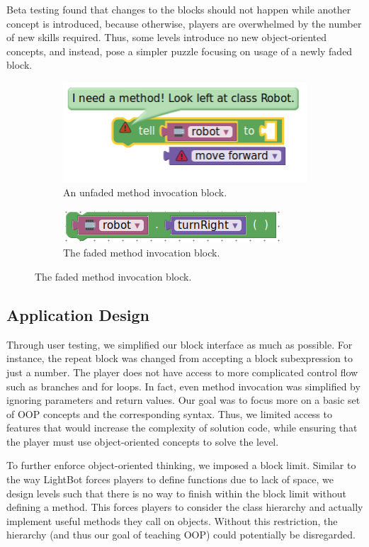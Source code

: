 \documentclass[12pt,notitlepage]{article}
\begin{document}
Beta testing found that changes to the blocks should not happen while
another concept is introduced, because otherwise, players are
overwhelmed by the number of new skills required. Thus, some levels
introduce no new object-oriented concepts, and instead, pose a simpler
puzzle focusing on usage of a newly faded block.

\begin{figure}[h]
\centering
\begin{subfigure}{.5\textwidth}
  \centering
  \includegraphics[width=.5\textwidth]{block_unfaded}
  \caption{An unfaded method invocation block.}\label{fig:block-unfaded}
\end{subfigure}%
\begin{subfigure}{.5\textwidth}
  \centering
  \includegraphics[width=.5\textwidth]{block_faded}
  \caption{The faded method invocation block.}\label{fig:block-faded}
\end{subfigure}
\label{fig:test}
\end{figure}


\subsection{Application Design}

Through user testing, we simplified our block interface as much as
possible. For instance, the repeat block was changed from accepting a
block subexpression to just a number. The player does not have access
to more complicated control flow such as branches and for loops. In
fact, even method invocation was simplified by ignoring parameters and
return values. Our goal was to focus more on a basic set of OOP
concepts and the corresponding syntax. Thus, we limited access to
features that would increase the complexity of solution code, while
ensuring that the player must use object-oriented concepts to solve
the level.

To further enforce object-oriented thinking, we imposed a block
limit. Similar to the way LightBot forces players to define functions
due to lack of space, we design levels such that there is no way to
finish within the block limit without defining a method. This forces
players to consider the class hierarchy and actually implement useful
methods they call on objects. Without this restriction, the hierarchy
(and thus our goal of teaching OOP) could potentially be disregarded.
\end{document}
